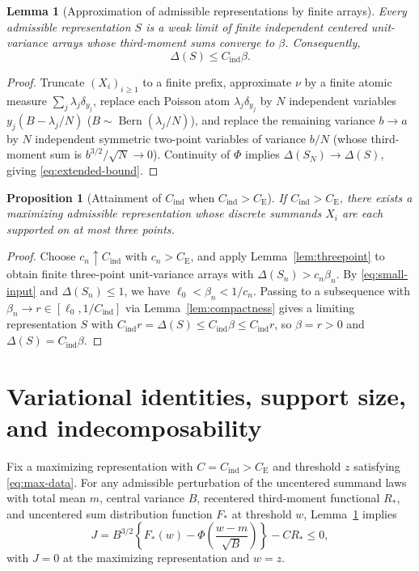 \documentclass[11pt]{article}
\numberwithin{equation}{section}
\newtheorem{proposition}[theorem]{Proposition}
\newtheorem{lemma}[theorem]{Lemma}
\theoremstyle{definition}
\DeclareMathOperator{\Bern}{Bern}
\newcommand{\ce}{C_{\mathrm E}}
\newcommand{\ci}{C_{\mathrm{ind}}}
\begin{document}
\begin{lemma}[Approximation of admissible representations by finite arrays]\label{lem:realization}
Every admissible representation $S$ is a weak limit of finite independent
centered unit-variance arrays whose third-moment sums converge to $\beta$.
Consequently,
\begin{equation}\label{eq:extended-bound}
                         \Delta(S)\le\ci\beta.
\end{equation}
\end{lemma}
\begin{proof}
Truncate $(X_i)_{i\ge1}$ to a finite prefix, approximate $\nu$ by a finite
atomic measure $\sum_j\lambda_j\delta_{y_j}$, replace each Poisson atom
$\lambda_j\delta_{y_j}$ by $N$ independent variables $y_j(B-\lambda_j/N)$
($B\sim\Bern(\lambda_j/N)$), and replace the remaining variance $b\to a$ by
$N$ independent symmetric two-point variables of variance $b/N$ (whose
third-moment sum is $b^{3/2}/\sqrt N\to0$). Continuity of $\Phi$ implies
$\Delta(S_N)\to\Delta(S)$, giving \eqref{eq:extended-bound}.
\end{proof}

\begin{proposition}[Attainment of $\ci$ when $\ci>\ce$]\label{prop:attainment}
If $\ci>\ce$, there exists a maximizing admissible representation whose
discrete summands $X_i$ are each supported on at most three points.
\end{proposition}
\begin{proof}
Choose $c_n\uparrow\ci$ with $c_n>\ce$, and apply Lemma~\ref{lem:threepoint}
to obtain finite three-point unit-variance arrays with $\Delta(S_n)>c_n\beta_n$.
By \eqref{eq:small-input} and $\Delta(S_n)\le1$, we have
$\ell_0<\beta_n<1/c_n$. Passing to a subsequence with $\beta_n\to r\in[\ell_0,1/\ci]$
via Lemma~\ref{lem:compactness} gives a limiting representation $S$ with
$\ci r=\Delta(S)\le\ci\beta\le\ci r$, so $\beta=r>0$ and $\Delta(S)=\ci\beta$.
\end{proof}

\section{Variational identities, support size, and indecomposability}\label{sec:variation}

Fix a maximizing representation with $C=\ci>\ce$ and threshold $z$ satisfying
\eqref{eq:max-data}. For any admissible perturbation of the uncentered
summand laws with total mean $m$, central variance $B$, recentered third-moment
functional $R_*$, and uncentered sum distribution function $F_*$ at threshold
$w$, Lemma~\ref{lem:realization} implies
\begin{equation}\label{eq:objective}
       J=B^{3/2}\left\{F_*(w)-\Phi\!\left(\frac{w-m}{\sqrt B}\right)\right\}
                    -C R_*\le0,
\end{equation}
with $J=0$ at the maximizing representation and $w=z$.
\end{document}
